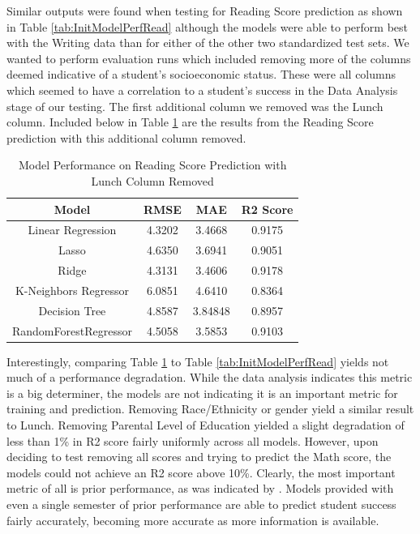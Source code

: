 \documentclass[doc]{apa6} %
\begin{document}
Similar outputs were found when testing for Reading Score prediction as shown in Table \ref{tab:InitModelPerfRead} although the models were able to perform best with the Writing data than for either of the other two standardized test sets.
We wanted to perform evaluation runs which included removing more of the columns deemed indicative of a student's socioeconomic status. These were all columns which seemed to have a correlation to a student's success in the Data Analysis stage of our testing.
The first additional column we removed was the Lunch column. Included below in Table \ref{tab:ReadNoLunch} are the results from the Reading Score prediction with this additional column removed.
\begin{table}[H]
    \centering
    \begin{tabular}{|c|c|c|c|}
    \hline
         Model & RMSE & MAE & R2 Score\\
         \hline\hline
         Linear Regression & 4.3202 & 3.4668 & 0.9175 \\
         \hline
         Lasso & 4.6350 & 3.6941 & 0.9051 \\
         \hline
         Ridge & 4.3131 & 3.4606 & 0.9178 \\
         \hline
         K-Neighbors Regressor & 6.0851 & 4.6410 & 0.8364 \\
         \hline
         Decision Tree & 4.8587 & 3.84848 & 0.8957 \\
         \hline
         RandomForestRegressor & 4.5058 & 3.5853 & 0.9103 \\
         \hline
    \end{tabular}
    \caption{Model Performance on Reading Score Prediction with Lunch Column Removed}
    \label{tab:ReadNoLunch}
\end{table}
Interestingly, comparing Table \ref{tab:ReadNoLunch} to Table \ref{tab:InitModelPerfRead} yields not much of a performance degradation. While the data analysis indicates this metric is a big determiner, the models are not indicating it is an important metric for training and prediction.
Removing Race/Ethnicity or gender yield a similar result to Lunch. Removing Parental Level of Education yielded a slight degradation of less than 1\% in R2 score fairly uniformly across all models.  However, upon deciding to test removing all scores and trying to predict the Math score, the models could not achieve an R2 score above 10\%.  Clearly, the most important metric of all is prior performance, as was indicated by \cite{7008697}. Models provided with even a single semester of prior performance are able to predict student success fairly accurately, becoming more accurate as more information is available.
\end{document}
